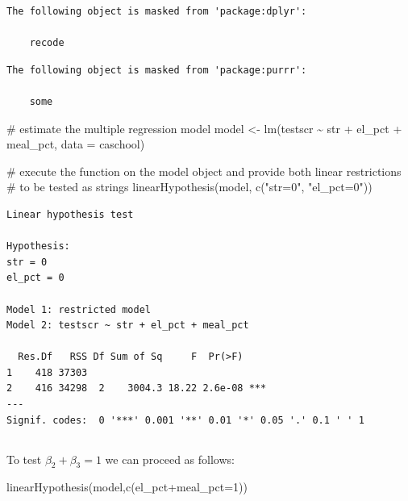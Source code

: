 \documentclass[
  letterpaper,
  DIV=11,
  numbers=noendperiod]{scrartcl}
\newenvironment{Shaded}{\begin{snugshade}}{\end{snugshade}}
\newcommand{\AttributeTok}[1]{\textcolor[rgb]{0.56,0.74,0.73}{#1}}
\newcommand{\CommentTok}[1]{\textcolor[rgb]{0.38,0.43,0.53}{#1}}
\newcommand{\FunctionTok}[1]{\textcolor[rgb]{0.53,0.75,0.82}{#1}}
\newcommand{\NormalTok}[1]{\textcolor[rgb]{0.85,0.87,0.91}{#1}}
\newcommand{\OtherTok}[1]{\textcolor[rgb]{0.56,0.74,0.73}{#1}}
\newcommand{\SpecialCharTok}[1]{\textcolor[rgb]{0.92,0.80,0.55}{#1}}
\newcommand{\StringTok}[1]{\textcolor[rgb]{0.64,0.75,0.55}{#1}}
\begin{document}
\begin{verbatim}
The following object is masked from 'package:dplyr':

    recode
\end{verbatim}

\begin{verbatim}
The following object is masked from 'package:purrr':

    some
\end{verbatim}

\begin{Shaded}
\begin{Highlighting}[]
\CommentTok{\# estimate the multiple regression model}
\NormalTok{model }\OtherTok{\textless{}{-}} \FunctionTok{lm}\NormalTok{(testscr }\SpecialCharTok{\textasciitilde{}}\NormalTok{ str }\SpecialCharTok{+}\NormalTok{ el\_pct }\SpecialCharTok{+}\NormalTok{ meal\_pct, }\AttributeTok{data =}\NormalTok{ caschool)}

\CommentTok{\# execute the function on the model object and provide both linear restrictions }
\CommentTok{\# to be tested as strings}
\FunctionTok{linearHypothesis}\NormalTok{(model, }\FunctionTok{c}\NormalTok{(}\StringTok{"str=0"}\NormalTok{, }\StringTok{"el\_pct=0"}\NormalTok{))}
\end{Highlighting}
\end{Shaded}

\begin{verbatim}
Linear hypothesis test

Hypothesis:
str = 0
el_pct = 0

Model 1: restricted model
Model 2: testscr ~ str + el_pct + meal_pct

  Res.Df   RSS Df Sum of Sq     F  Pr(>F)    
1    418 37303                               
2    416 34298  2    3004.3 18.22 2.6e-08 ***
---
Signif. codes:  0 '***' 0.001 '**' 0.01 '*' 0.05 '.' 0.1 ' ' 1
\end{verbatim}

\hypertarget{section-14}{%
\subsection{}\label{section-14}}

To test \(\beta_2+\beta_3=1\) we can proceed as follows:

\begin{Shaded}
\begin{Highlighting}[]
\FunctionTok{linearHypothesis}\NormalTok{(model,}\FunctionTok{c}\NormalTok{(}\StringTok{\textquotesingle{}el\_pct+meal\_pct=1\textquotesingle{}}\NormalTok{))}
\end{Highlighting}
\end{Shaded}
\end{document}
